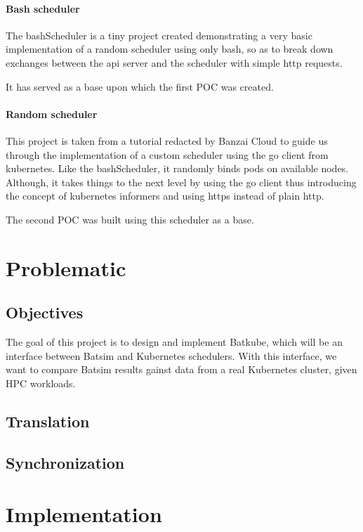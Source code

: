 \documentclass[12pt]{report}
\begin{document}
\subsubsection{Bash scheduler}

The bashScheduler\cite{bashScheduler} is a tiny project created demonstrating a
very basic implementation of a random scheduler using only bash, so as to break
down exchanges between the api server and the scheduler with simple http
requests.

It has served as a base upon which the first POC was created.

\subsubsection{Random scheduler}

This project is taken from a tutorial\cite{banzai-tuto} redacted by Banzai
Cloud to guide us through the implementation of a custom scheduler using the go
client\cite{client-go} from kubernetes.
Like the bashScheduler, it randomly binds pods on available nodes. Although, it
takes things to the next level by using the go client thus introducing the
concept of kubernetes informers and using https instead of plain http.

The second POC was built using this scheduler as a base.

\chapter{Problematic}

\section{Objectives}

The goal of this project is to design and implement Batkube, which will be an
interface between Batsim and Kubernetes schedulers. With this interface, we
want to compare Batsim results gainst data from a real Kubernetes cluster,
given HPC workloads.

\section{Translation}

\section{Synchronization}

\chapter{Implementation}
\end{document}

